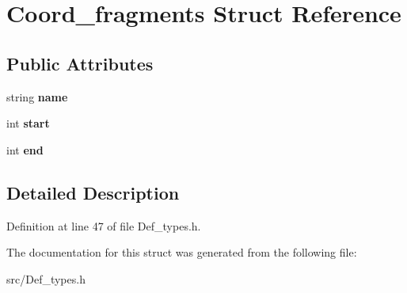 \hypertarget{struct_coord__fragments}{}\section{Coord\+\_\+fragments Struct Reference}
\label{struct_coord__fragments}
\subsection*{Public Attributes}
\begin{DoxyCompactItemize}
\item 
\mbox{\label{struct_coord__fragments_a9e938a77973f78423fe729d7cb46984f}} 
string {\bfseries name}
\item 
\mbox{\label{struct_coord__fragments_a9d623b4bfd642fbfb5e54760b9829a76}} 
int {\bfseries start}
\item 
\mbox{\label{struct_coord__fragments_a9216e0fbdb2b13ab63dd92acb716fdc8}} 
int {\bfseries end}
\end{DoxyCompactItemize}


\subsection{Detailed Description}


Definition at line 47 of file Def\+\_\+types.\+h.



The documentation for this struct was generated from the following file\+:\begin{DoxyCompactItemize}
\item 
src/Def\+\_\+types.\+h\end{DoxyCompactItemize}
